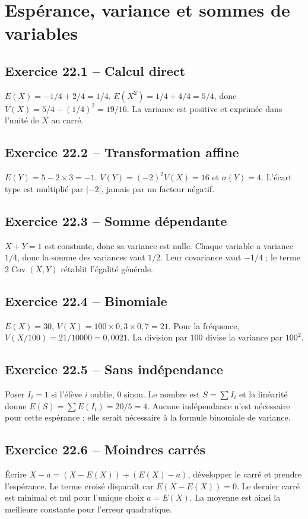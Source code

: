 \chapter{Espérance, variance et sommes de variables}
\section*{Exercice 22.1 -- Calcul direct}
$E(X)=-1/4+2/4=1/4$. $E(X^2)=1/4+4/4=5/4$, donc $V(X)=5/4-(1/4)^2=19/16$. La variance est positive et exprimée dans l'unité de $X$ au carré.

\section*{Exercice 22.2 -- Transformation affine}
$E(Y)=5-2\times3=-1$. $V(Y)=(-2)^2V(X)=16$ et $\sigma(Y)=4$. L'écart type est multiplié par $|-2|$, jamais par un facteur négatif.

\section*{Exercice 22.3 -- Somme dépendante}
$X+Y=1$ est constante, donc sa variance est nulle. Chaque variable a variance $1/4$, donc la somme des variances vaut $1/2$. Leur covariance vaut $-1/4$ ; le terme $2\operatorname{Cov}(X,Y)$ rétablit l'égalité générale.

\section*{Exercice 22.4 -- Binomiale}
$E(X)=30$, $V(X)=100\times0{,}3\times0{,}7=21$. Pour la fréquence, $V(X/100)=21/10000=0{,}0021$. La division par $100$ divise la variance par $100^2$.

\section*{Exercice 22.5 -- Sans indépendance}
Poser $I_i=1$ si l'élève $i$ oublie, $0$ sinon. Le nombre est $S=\sum I_i$ et la linéarité donne $E(S)=\sum E(I_i)=20/5=4$. Aucune indépendance n'est nécessaire pour cette espérance ; elle serait nécessaire à la formule binomiale de variance.

\section*{Exercice 22.6 -- Moindres carrés}
Écrire $X-a=(X-E(X))+(E(X)-a)$, développer le carré et prendre l'espérance. Le terme croisé disparaît car $E(X-E(X))=0$. Le dernier carré est minimal et nul pour l'unique choix $a=E(X)$. La moyenne est ainsi la meilleure constante pour l'erreur quadratique.
